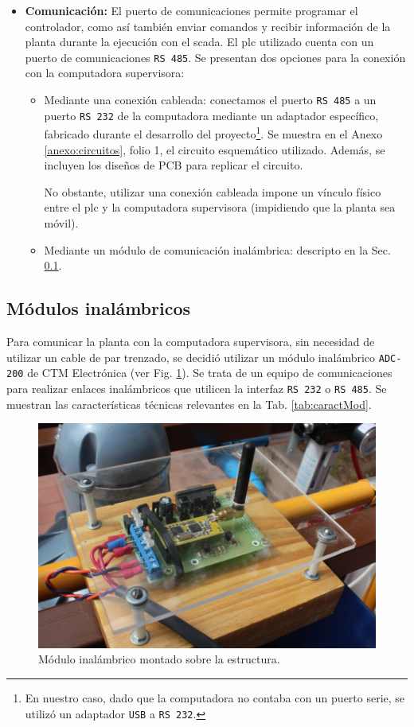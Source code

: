 \begin{itemize}
\item \textbf{Comunicación:} El puerto de comunicaciones permite programar el 
controlador, como así también enviar comandos y recibir información de
la planta durante la ejecución con el \gls{scada}.
El \gls{plc} utilizado cuenta con un puerto de comunicaciones \verb|RS 485|.
Se presentan dos opciones para la conexión con la computadora supervisora:
\begin{itemize}
 \item Mediante una conexión cableada:
 conectamos el puerto \verb|RS 485| a un puerto \verb|RS 232| de la computadora
mediante un adaptador específico, fabricado durante el desarrollo del
proyecto\footnote{En nuestro caso, dado que la computadora no contaba con un
puerto serie, se utilizó un adaptador
\texttt{USB} a \texttt{RS 232}.}.
Se muestra en el Anexo \ref{anexo:circuitos}, folio 1, el circuito esquemático
utilizado.
Además, se incluyen los diseños de PCB para replicar el circuito.

No obstante, utilizar una conexión cableada impone un vínculo físico entre
el \gls{plc} y la computadora supervisora (impidiendo que la planta sea móvil).
\item Mediante un módulo de comunicación inalámbrica:
descripto en la Sec. \ref{subsec:inalambrico}.
\end{itemize}
\end{itemize}

\subsection{Módulos inalámbricos}
\label{subsec:inalambrico}

Para comunicar la planta con la computadora supervisora, sin necesidad de
utilizar un cable de par trenzado, se decidió utilizar un módulo inalámbrico
\verb|ADC-200| de CTM Electrónica (ver Fig. \ref{fig:fotoModuloIn}).
Se trata de un equipo de comunicaciones para realizar enlaces inalámbricos que
utilicen la interfaz \verb|RS 232| o \verb|RS 485|.
Se muestran las características técnicas relevantes en la Tab.
\ref{tab:caractMod}.

\begin{figure}[t]
\centering
\includegraphics[width=.6\textwidth]{Cap3-TableroElectrico/Images/IMG_5038.JPG}
 \caption{Módulo inalámbrico montado sobre la estructura.}
 \label{fig:fotoModuloIn}
\end{figure}

